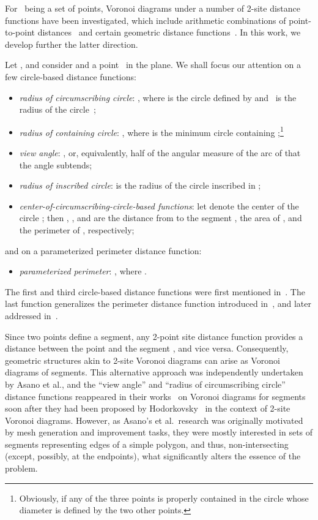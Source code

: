 \documentclass[10pt, conference, compsocconf]{IEEEtran}
\begin{document}
For~ being a set of points, Voronoi diagrams under a number of 2-site
distance functions have been investigated, which include arithmetic
combinations of point-to-point distances~\cite{BDD02,VB10} and certain
geometric distance functions~\cite{BDD02,DE09,HB09}.  In this work, we
develop further the latter direction.

Let , and consider  and a point~ in the
plane.  We shall focus our attention on a few circle-based distance
functions:
\begin{itemize}
\item \emph{radius of circumscribing circle}:
      , where  is
      the circle defined by  and~ is the radius of
      the circle~;
\item \emph{radius of containing circle}:
      , where  is
      the minimum circle containing ;\footnote{
         Obviously,  if any of the three
         points is properly contained in the circle whose diameter is
         defined by the two other points.
      }
\item \emph{view angle}:
      , or, equivalently, half of the
      angular measure of the arc of  that the angle
       subtends;
\item \emph{radius of inscribed circle}:
       is the radius of the circle inscribed in
      ;
\item \emph{center-of-circumscribing-circle-based functions}:
      let  denote the center of the circle ; then
      , , and  are the
      distance from  to the segment , the area of
      , and the perimeter of ,
      respectively;
\end{itemize}
and on a parameterized perimeter distance function:
\begin{itemize}
\item \emph{parameterized perimeter}:
       , where .
\end{itemize}
The first and third circle-based distance functions were first mentioned
in~\cite{H05}.  The last function generalizes the perimeter distance function
 introduced in~\cite{BDD02},
and later addressed in~\cite{DE09,HB09}.

Since two points define a segment, any 2-point site distance function
 provides a distance between the point  and the segment ,
and vice versa.  Consequently, geometric structures akin to 2-site Voronoi
diagrams can arise as Voronoi diagrams of segments.  This alternative approach
was independently undertaken by Asano et al., and the ``view angle'' and
``radius of circumscribing circle'' distance functions reappeared in their
works~\cite{AKTT06,AKTT07} on Voronoi diagrams for segments soon after they
had been proposed by Hodorkovsky~\cite{H05} in the context of 2-site Voronoi
diagrams.  However, as Asano's et al.\ research was originally motivated by
mesh generation and improvement tasks, they were mostly interested in sets of
segments representing edges of a simple polygon, and thus, non-intersecting
(except, possibly, at the endpoints), what significantly alters the essence
of the problem.
\end{document}
